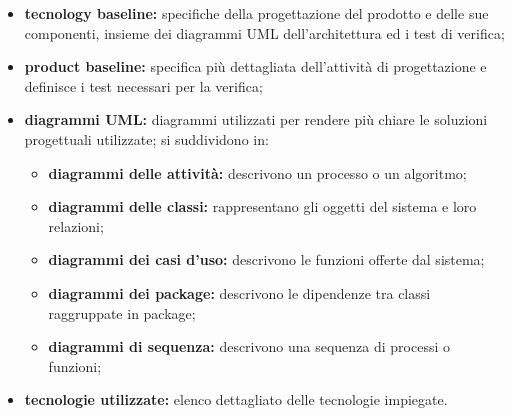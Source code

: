 					\begin{itemize}
						\item \textbf{tecnology baseline:} specifiche della progettazione del prodotto e delle sue componenti, insieme dei diagrammi UML dell'architettura ed i test di verifica;
						\item \textbf{product baseline:} specifica più dettagliata dell'attività di progettazione e definisce i test necessari per la verifica;
						\item \textbf{diagrammi UML:} diagrammi utilizzati per rendere più chiare le soluzioni progettuali utilizzate; si suddividono in:	
						\begin{itemize}
							\item \textbf{diagrammi delle attività:} descrivono un processo o un algoritmo;
							\item \textbf{diagrammi delle classi:} rappresentano gli oggetti del sistema e loro relazioni;
							\item \textbf{diagrammi dei casi d'uso:} descrivono le funzioni offerte dal sistema;
							\item \textbf{diagrammi dei package:} descrivono le dipendenze tra classi raggruppate in package;
							\item \textbf{diagrammi di sequenza:} descrivono una sequenza di processi o funzioni;
						\end{itemize}
						\item \textbf{tecnologie utilizzate:} elenco dettagliato delle tecnologie impiegate.
						\end{itemize}	
				
